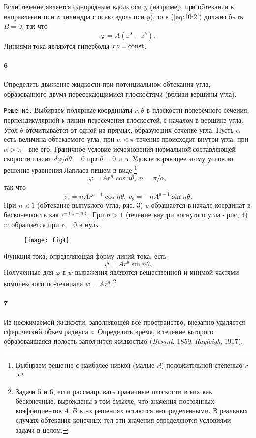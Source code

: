 Если течение является однородным вдоль оси $y$ (например, при обтекании в
направлении оси $z$ цилиндра с осью вдоль оси $y$), то в (\ref{eq:10t2}) должно быть $B=0$,
так что
\[
   \varphi = A(x^2 - z^2).
\]
Линиями тока являются гиперболы $xz = \mathop{\mathrm{const}}\nolimits$.

\paragraph*{6}
Определить движение жидкости при потенциальном обтекании угла, образованного
двумя пересекающимися плоскостями  (вблизи вершины угла).

\texttt{Решение.} Выбираем полярные координаты $r,\theta$ в плоскости
поперечного сечеиия, перпендикулярной к линии пересечения плоскостей, с началом
в вершине угла. Угол $\theta$ отсчитывается от одной из прямых, образующих
сечение угла. Пусть $\alpha$ есть величина обтекаемого угла; при $\alpha<\pi$
течение происходит внутри угла, при $\alpha>\pi$ - вне его. Граничное условие
исчезновения нормальной составляющей скорости гласит $d\varphi/d\theta = 0$ при
$\theta = 0$ и $\alpha$. Удовлетворяющее этому условию решение уравнения Лапласа
пишем в виде \footnote{Выбираем решение с наиболее низкой (малые $r$!) положительной степенью $r$.}
\[
   \varphi = Ar^n\cos n\theta,\; n = \pi/\alpha,
\]
так что
\[
   v_r = nAr^{n-1}\cos n\theta,\; v_{\theta}=-nA^{n-1}\sin n\theta.
\]
При $n<1$ (обтекание выпуклого угла; рис. 3) $v$ обращается в начале координат
в бесконечность как $r^{-(1-n)}$. При $n>1$ (течение внутри вогнутого
угла - рис, 4) $v$; обращается при $r=0$ в нуль.

\begin{wrapfigure}{r}{6cm}
  \centering
  \texttt{[image: fig4]}
  \caption{\label{fig:f4}}
\end{wrapfigure}

Функция тока, определяющая форму линий тока, есть
\[
   \psi = Ar^n \sin n\theta.
\]
Полученные для $\varphi$ п $\psi$ выражения являются вещественной и мнимой
частями комплексного по-тенииала $w = Az^n$ \footnote{Задачи 5 и 6, если рассматривать
граничные плоскости в них как бесконечные, вырождены в том смысле, что значения постоянных
коэффициентов $A,B$ в нх решениях остаются неопределенными. В реальных случаях обтекания
конечных тел эти значения определяются условиями задачи в целом.}.

\paragraph*{7}
Из несжимаемой жидкости, заполняющей все пространство, внезапно удаляется
сферический объем радиуса $a$. Определить время, в течение которого
образоваишаяся полость заполнится жидкостью  (\textit{Besant}, 1859;
\textit{Rayleigh}, 1917).

